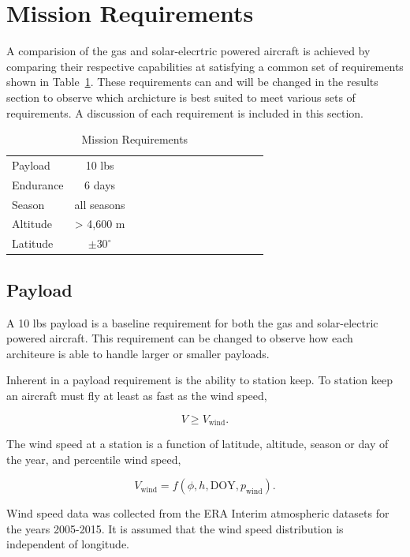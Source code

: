 \section{Mission Requirements}

A comparision of the gas and solar-elecrtric powered aircraft is achieved by comparing their respective capabilities at satisfying a common set of requirements shown in Table~\ref{t:mreqs}.  These requirements can and will be changed in the results section to observe which archicture is best suited to meet various sets of requirements. A discussion of each requirement is included in this section.  

\begin{longtable}{lccccccccccccc}
\caption{Mission Requirements}\\
\toprule
\toprule
\label{t:mreqs}
Payload & 10 lbs\\
Endurance & 6 days\\
Season & all seasons\\
Altitude & > 4,600 m\\
Latitude & $\pm30^{\circ}$\\
\bottomrule
\end{longtable}

\subsection{Payload}

A 10 lbs payload is a baseline requirement for both the gas and solar-electric powered aircraft. This requirement can be changed to observe how each architeure is able to handle larger or smaller payloads.

Inherent in a payload requirement is the ability to station keep. To station keep an aircraft must fly at least as fast as the wind speed,

\begin{equation}
    \label{e:availreq}
    V \geq V_{\text{wind}}.
\end{equation}

The wind speed at a station is a function of latitude, altitude, season or day of the year, and percentile wind speed,

\begin{equation}
    \label{e:windspeed}
    V_{\text{wind}} = f(\phi, h, \text{DOY}, p_{\text{wind}}).
    \end{equation}

Wind speed data was collected from the ERA Interim atmospheric datasets for the years 2005-2015.\cite{wind} 
It is assumed that the wind speed distribution is independent of longitude. 

